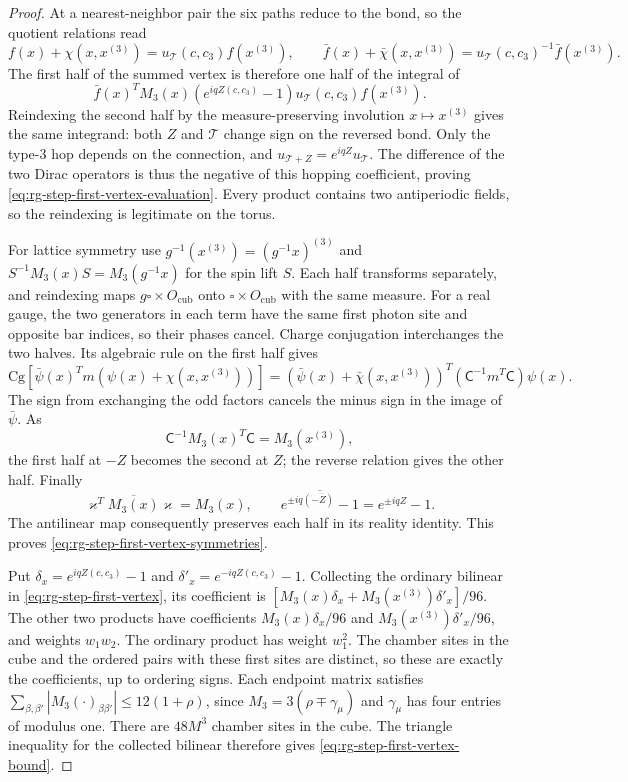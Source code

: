\begin{proof}
At a nearest-neighbor pair the six paths reduce to
the bond, so the quotient relations read
\[
 f(x)+\chi(x,x^{(3)})=u_{\mathscr T}(c,c_3)f(x^{(3)}),
 \qquad
 \bar f(x)+\bar\chi(x,x^{(3)})
                         =u_{\mathscr T}(c,c_3)^{-1}\bar f(x^{(3)}).
\]
The first half of the summed vertex is therefore
one half of the integral of
\[
 \bar f(x)^TM_3(x)(e^{iqZ(c,c_3)}-1)
                                  u_{\mathscr T}(c,c_3)f(x^{(3)}).
\]
Reindexing the second half by the measure-preserving
involution $x\mapsto x^{(3)}$ gives the same
integrand: both $Z$ and $\mathscr T$ change sign
on the reversed bond. Only the type-$3$ hop
depends on the connection, and
$u_{\mathscr T+Z}=e^{iqZ}u_{\mathscr T}$.
The difference of the two Dirac operators is
thus the negative of this hopping coefficient,
proving \eqref{eq:rg-step-first-vertex-evaluation}.
Every product contains two antiperiodic fields,
so the reindexing is legitimate on the torus.

For lattice symmetry use
$g^{-1}(x^{(3)})=(g^{-1}x)^{(3)}$ and
$S^{-1}M_3(x)S=M_3(g^{-1}x)$ for the spin
lift $S$. Each half transforms separately, and
reindexing maps $g\square\times O_{\mathrm{cub}}$
onto $\square\times O_{\mathrm{cub}}$ with the
same measure. For a real gauge, the two generators
in each term have the same first photon site and
opposite bar indices, so their phases cancel.
Charge conjugation interchanges the two halves.
Its algebraic rule on the first half gives
\[
 \mathrm{Cg}[\bar\psi(x)^Tm(\psi(x)+\chi(x,x^{(3)}))]
       =(\bar\psi(x)+\bar\chi(x,x^{(3)}))^T
                              (\mathsf C^{-1}m^T\mathsf C)\psi(x).
\]
The sign from exchanging the odd factors cancels
the minus sign in the image of $\bar\psi$.
As
\[
 \mathsf C^{-1}M_3(x)^T\mathsf C=M_3(x^{(3)}),
\]
the first half at $-Z$ becomes the second at $Z$;
the reverse relation gives the other half.
Finally
\[
 \varkappa^T\overline{M_3(x)}\varkappa=M_3(x),\qquad
 \overline{e^{\pm iq(-\overline Z)}-1}=e^{\pm iqZ}-1.
\]
The antilinear map consequently preserves each
half in its reality identity. This proves
\eqref{eq:rg-step-first-vertex-symmetries}.

Put $\delta_x=e^{iqZ(c,c_3)}-1$ and
$\delta'_x=e^{-iqZ(c,c_3)}-1$. Collecting the
ordinary bilinear in \eqref{eq:rg-step-first-vertex},
its coefficient is
$[M_3(x)\delta_x+M_3(x^{(3)})\delta'_x]/96$.
The other two products have coefficients
$M_3(x)\delta_x/96$ and
$M_3(x^{(3)})\delta'_x/96$, and weights
$w_1w_2$.
The ordinary product has weight $w_1^2$.
The chamber sites in the cube and the ordered
pairs with these first sites are distinct, so
these are exactly the coefficients, up to
ordering signs. Each endpoint matrix satisfies
$\sum_{\beta,\beta'}|M_3(\cdot)_{\beta\beta'}|
\le12(1+\rho)$, since
$M_3=3(\rho\mp\gamma_\mu)$ and $\gamma_\mu$
has four entries of modulus one.
There are $48M^3$ chamber sites in the cube.
The triangle inequality for the collected
bilinear therefore gives
\eqref{eq:rg-step-first-vertex-bound}.


\end{proof}
